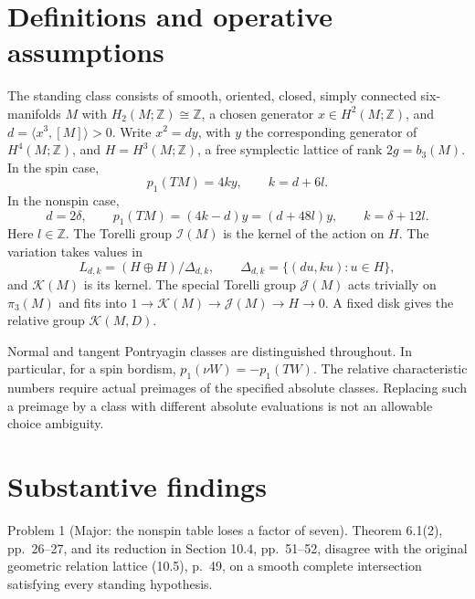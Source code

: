 \documentclass[10pt]{article}
\begin{document}
\section*{Definitions and operative assumptions}
The standing class consists of smooth, oriented, closed, simply connected six-manifolds \(M\) with \(H_2(M;\mathbb Z)\cong\mathbb Z\), a chosen generator \(x\in H^2(M;\mathbb Z)\), and \(d=\langle x^3,[M]\rangle>0\). Write \(x^2=dy\), with \(y\) the corresponding generator of \(H^4(M;\mathbb Z)\), and \(H=H^3(M;\mathbb Z)\), a free symplectic lattice of rank \(2g=b_3(M)\). In the spin case, \[p_1(TM)=4ky,\qquad k=d+6l.\] In the nonspin case, \[d=2\delta,\qquad p_1(TM)=(4k-d)y=(d+48l)y,\qquad
 k=\delta+12l.\] Here \(l\in\mathbb Z\). The Torelli group \(\mathcal I(M)\) is the kernel of the action on \(H\). The variation takes values in \[L_{d,k}=(H\oplus H)/\Delta_{d,k},\qquad
 \Delta_{d,k}=\{(du,ku):u\in H\},\] and \(\mathcal K(M)\) is its kernel. The special Torelli group \(\mathcal J(M)\) acts trivially on \(\pi_3(M)\) and fits into \(1\to\mathcal K(M)\to\mathcal J(M)\to H\to0\). A fixed disk gives the relative group \(\mathcal K(M,D)\).\par
Normal and tangent Pontryagin classes are distinguished throughout. In particular, for a spin bordism, \(p_1(\nu W)=-p_1(TW)\). The relative characteristic numbers require actual preimages of the specified absolute classes. Replacing such a preimage by a class with different absolute evaluations is not an allowable choice ambiguity.\par
\section*{Substantive findings}
Problem 1 (Major: the nonspin table loses a factor of seven).  Theorem 6.1(2), pp. 26–27, and its reduction in Section 10.4, pp. 51–52, disagree with the original geometric relation lattice (10.5), p. 49, on a smooth complete intersection satisfying every standing hypothesis.\par
\end{document}
